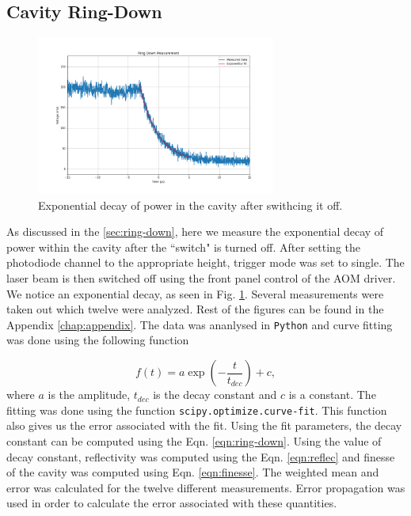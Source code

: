 \documentclass[a4paper]{report}
\numberwithin{equation}{section}
\begin{document}
\subsection{Cavity Ring-Down}

\begin{figure}[htpb]
    \centering
    \includegraphics[width=0.7\textwidth]{ring-down}
    \caption{Exponential decay of power in the cavity after swithcing it off.}
    \label{fig:ring-down}
\end{figure}

As discussed in the \ref{sec:ring-down}, here we measure the exponential decay of power within the cavity after the ``switch" is turned off. After setting the photodiode channel to the appropriate height, trigger mode was set to single. The laser beam is then switched off using the front panel control of the AOM driver. We notice an exponential decay, as seen in Fig. \ref{fig:ring-down}. Several measurements were taken out which twelve were analyzed. Rest of the figures can be found in the Appendix \ref{chap:appendix}. The data was ananlysed in \texttt{Python} and curve fitting was done using the following function

\begin{equation}
		f(t) = a \exp\left(-\frac{t}{t_{dec}}\right) + c,
\end{equation}
where $a$ is the amplitude, $t_{dec}$ is the decay constant and $c$ is a constant. The fitting was done using the function \texttt{scipy.optimize.curve-fit}. This function also gives us the error associated with the fit. Using the fit parameters, the decay constant can be computed using the Eqn. \ref{eqn:ring-down}. Using the value of decay constant, reflectivity was computed using the Eqn. \ref{eqn:reflec} and finesse of the cavity was computed using Eqn. \ref{eqn:finesse}. The weighted mean and error was calculated for the twelve different measurements. Error propagation was used in order to calculate the error associated with these quantities.
\end{document}

